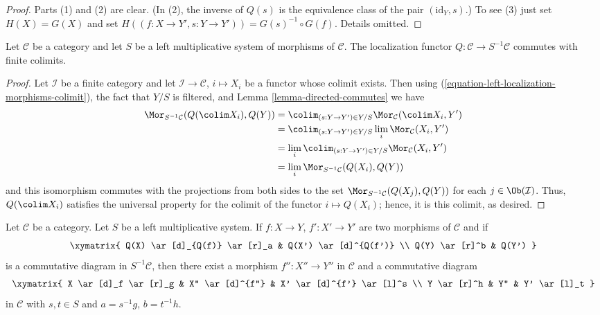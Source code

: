\begin{proof}
Parts (1) and (2) are clear. (In (2), the inverse of $Q(s)$ is
the equivalence class of the pair $(\text{id}_Y, s)$.)
To see (3) just set $H(X) = G(X)$
and set $H((f : X \to Y', s : Y \to Y')) = G(s)^{-1} \circ G(f)$.
Details omitted.
\end{proof}

\begin{lemma}
\label{lemma-left-localization-limits}
Let $\mathcal{C}$ be a category and let $S$ be a left multiplicative
system of morphisms of $\mathcal{C}$. The localization functor
$Q : \mathcal{C} \to S^{-1}\mathcal{C}$ commutes with finite colimits.
\end{lemma}

\begin{proof}
Let $\mathcal{I}$ be a finite category and let
$\mathcal{I} \to \mathcal{C}$, $i \mapsto X_i$
be a functor whose colimit exists. Then using
(\ref{equation-left-localization-morphisms-colimit}),
the fact that $Y/S$ is filtered, and
Lemma \ref{lemma-directed-commutes} we have
\begin{align*}
\Mor_{S^{-1}\mathcal{C}}(Q(\colim X_i), Q(Y))
& =
\colim_{(s : Y \to Y') \in Y/S} \Mor_\mathcal{C}(\colim X_i, Y') \\
& =
\colim_{(s : Y \to Y') \in Y/S} \lim_i \Mor_\mathcal{C}(X_i, Y') \\
& =
\lim_i \colim_{(s : Y \to Y') \in Y/S} \Mor_\mathcal{C}(X_i, Y') \\
& =
\lim_i \Mor_{S^{-1}\mathcal{C}}(Q(X_i), Q(Y))
\end{align*}
and this isomorphism commutes with the projections
from both sides to the set
$\Mor_{S^{-1}\mathcal{C}}(Q(X_j), Q(Y))$ for each
$j \in \Ob(\mathcal{I})$. Thus, $Q(\colim X_i)$ satisfies
the universal property for the colimit of the functor
$i \mapsto Q(X_i)$; hence, it is this colimit, as desired.
\end{proof}

\begin{lemma}
\label{lemma-left-localization-diagram}
Let $\mathcal{C}$ be a category. Let $S$ be a left multiplicative
system. If $f : X \to Y$, $f' : X' \to Y'$ are two morphisms of
$\mathcal{C}$ and if
$$
\xymatrix{
Q(X) \ar[d]_{Q(f)} \ar[r]_a & Q(X') \ar[d]^{Q(f')} \\
Q(Y) \ar[r]^b & Q(Y')
}
$$
is a commutative diagram in $S^{-1}\mathcal{C}$, then there exist
a morphism $f'' : X'' \to Y''$ in $\mathcal{C}$ and a commutative
diagram
$$
\xymatrix{
X \ar[d]_f \ar[r]_g & X'' \ar[d]^{f''} & X' \ar[d]^{f'} \ar[l]^s \\
Y \ar[r]^h & Y'' & Y' \ar[l]_t
}
$$
in $\mathcal{C}$ with $s, t \in S$ and $a = s^{-1}g$, $b = t^{-1}h$.
\end{lemma}

